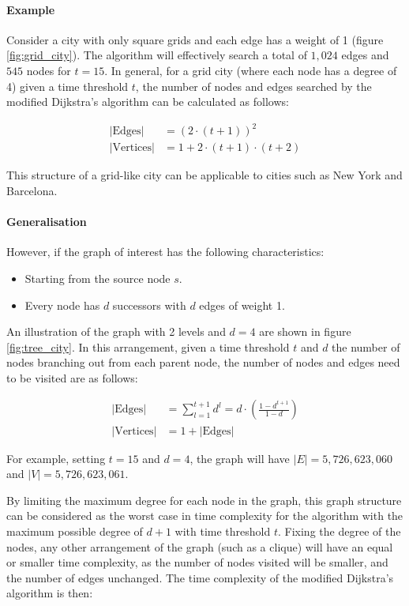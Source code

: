 \paragraph{Example}

Consider a city with only square grids and each edge has a weight of 1 (figure \ref{fig:grid_city}). The algorithm will effectively search a total of $1,024$ edges and $545$ nodes for $t=15$. In general, for a grid city (where each node has a degree of 4) given a time threshold $t$, the number of nodes and edges searched by the modified Dijkstra's algorithm can be calculated as follows:

$$
\begin{aligned}
    |\text{Edges}|&=(2\cdot(t+1))^2\\
    |\text{Vertices}|&=1+2\cdot(t+1)\cdot(t+2)
\end{aligned}
$$

This structure of a grid-like city can be applicable to cities such as New York and Barcelona.

\paragraph{Generalisation}

However, if the graph of interest has the following characteristics:

\begin{itemize}
    \item Starting from the source node $s$.
    \item Every node has $d$ successors with $d$ edges of weight 1.
\end{itemize}

An illustration of the graph with 2 levels and $d = 4$ are shown in figure \ref{fig:tree_city}. In this arrangement, given a time threshold $t$ and $d$ the number of nodes branching out from each parent node, the number of nodes and edges need to be visited are as follows:

$$
\begin{aligned}
    |\text{Edges}|&=\sum_{l=1}^{t+1} d^l=d\cdot\left(\frac{1-d^{t+1}}{1-d}\right)\\
    |\text{Vertices}|&=1+|\text{Edges}|
\end{aligned}
$$

For example, setting $t=15$ and $d=4$, the graph will have $|E|=5,726,623,060$ and $|V|=5,726,623,061$.

By limiting the maximum degree for each node in the graph, this graph structure can be considered as the worst case in time complexity for the algorithm with the maximum possible degree of $d+1$ with time threshold $t$. Fixing the degree of the nodes, any other arrangement of the graph (such as a clique) will have an equal or smaller time complexity, as the number of nodes visited will be smaller, and the number of edges unchanged. The time complexity of the modified Dijkstra's algorithm is then:


